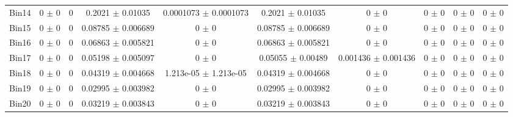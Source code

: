 \begin{tabular}{@{\extracolsep{4pt}}lccccccccc@{}}
     Bin14 & 0 $\pm$ 0 & 0 & 0.2021 $\pm$ 0.01035 & 0.0001073 $\pm$ 0.0001073 & 0.2021 $\pm$ 0.01035 & 0 $\pm$ 0 & 0 $\pm$ 0 & 0 $\pm$ 0 & 0 $\pm$ 0 \\ 
     Bin15 & 0 $\pm$ 0 & 0 & 0.08785 $\pm$ 0.006689 & 0 $\pm$ 0 & 0.08785 $\pm$ 0.006689 & 0 $\pm$ 0 & 0 $\pm$ 0 & 0 $\pm$ 0 & 0 $\pm$ 0 \\ 
     Bin16 & 0 $\pm$ 0 & 0 & 0.06863 $\pm$ 0.005821 & 0 $\pm$ 0 & 0.06863 $\pm$ 0.005821 & 0 $\pm$ 0 & 0 $\pm$ 0 & 0 $\pm$ 0 & 0 $\pm$ 0 \\ 
     Bin17 & 0 $\pm$ 0 & 0 & 0.05198 $\pm$ 0.005097 & 0 $\pm$ 0 & 0.05055 $\pm$ 0.00489 & 0.001436 $\pm$ 0.001436 & 0 $\pm$ 0 & 0 $\pm$ 0 & 0 $\pm$ 0 \\ 
     Bin18 & 0 $\pm$ 0 & 0 & 0.04319 $\pm$ 0.004668 & 1.213e-05 $\pm$ 1.213e-05 & 0.04319 $\pm$ 0.004668 & 0 $\pm$ 0 & 0 $\pm$ 0 & 0 $\pm$ 0 & 0 $\pm$ 0 \\ 
     Bin19 & 0 $\pm$ 0 & 0 & 0.02995 $\pm$ 0.003982 & 0 $\pm$ 0 & 0.02995 $\pm$ 0.003982 & 0 $\pm$ 0 & 0 $\pm$ 0 & 0 $\pm$ 0 & 0 $\pm$ 0 \\ 
     Bin20 & 0 $\pm$ 0 & 0 & 0.03219 $\pm$ 0.003843 & 0 $\pm$ 0 & 0.03219 $\pm$ 0.003843 & 0 $\pm$ 0 & 0 $\pm$ 0 & 0 $\pm$ 0 & 0 $\pm$ 0 \\ 
\hline\hline
  \end{tabular}
